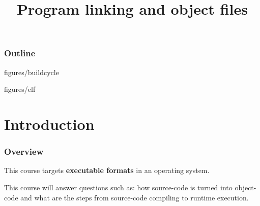 %
%
%
%
%
%

%
%

%
%

\def\path{../..}

%
%



%
%

\title{Program linking and object files}

%
%



%
%

\begin{frame}
  \titlepage
\end{frame}

%
%

\begin{frame}
  \frametitle{Outline}

  \tableofcontents
\end{frame}

%
%

                {figures/buildcycle}

                {figures/elf}

%
%

%
%

\section{Introduction}


\begin{frame}
  \frametitle{Overview}

  This course targets \textbf{executable formats} in an operating system.

  \-

  This course will answer questions such as: how source-code is turned into
  object-code and what are the steps from source-code compiling to
  runtime execution.

\end{frame}

